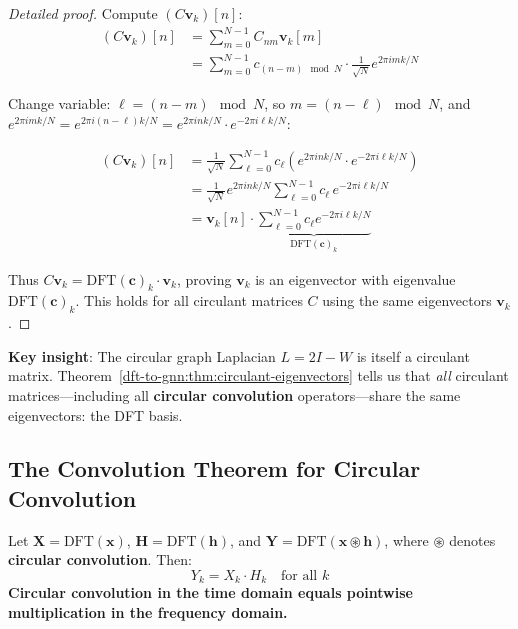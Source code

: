 \begin{notechapter}
\begin{proof}[Detailed proof]
Compute $(C\mathbf{v}_k)[n]$:
\begin{align*}
(C\mathbf{v}_k)[n] 
    &= \sum_{m=0}^{N-1} C_{nm} \mathbf{v}_k[m] \\
    &= \sum_{m=0}^{N-1} c_{(n-m) \mod N} \cdot \frac{1}{\sqrt{N}} 
       e^{2\pi i mk/N}
\end{align*}

Change variable: $\ell = (n-m) \mod N$, so $m = (n-\ell) \mod N$, and 
$e^{2\pi i mk/N} = e^{2\pi i (n-\ell)k/N} = e^{2\pi i nk/N} 
\cdot e^{-2\pi i \ell k/N}$:

\begin{align*}
(C\mathbf{v}_k)[n] 
    &= \frac{1}{\sqrt{N}} \sum_{\ell=0}^{N-1} c_\ell 
       \left( e^{2\pi i nk/N} \cdot e^{-2\pi i \ell k/N} \right) \\
    &= \frac{1}{\sqrt{N}} e^{2\pi i nk/N} 
       \sum_{\ell=0}^{N-1} c_\ell \, e^{-2\pi i \ell k/N} \\
    &= \mathbf{v}_k[n] \cdot \underbrace{\sum_{\ell=0}^{N-1} c_\ell 
       e^{-2\pi i \ell k/N}}_{\text{DFT}(\mathbf{c})_k}
\end{align*}

Thus $C\mathbf{v}_k = \text{DFT}(\mathbf{c})_k \cdot \mathbf{v}_k$, 
proving $\mathbf{v}_k$ is an eigenvector with eigenvalue 
$\text{DFT}(\mathbf{c})_k$. This holds for all circulant matrices $C$
using the same eigenvectors $\mathbf{v}_k$.
\end{proof}

\textbf{Key insight}: The circular graph Laplacian $L = 2I - W$ is 
itself a circulant matrix. Theorem~\ref{dft-to-gnn:thm:circulant-eigenvectors} 
tells us that \emph{all} circulant matrices---including all 
\textbf{circular convolution} operators---share the same eigenvectors: 
the DFT basis.

\subsection{The Convolution Theorem for Circular Convolution}

\begin{theorem}
\label{dft-to-gnn:thm:convolution-circular}
Let $\mathbf{X} = \text{DFT}(\mathbf{x})$, 
$\mathbf{H} = \text{DFT}(\mathbf{h})$, and 
$\mathbf{Y} = \text{DFT}(\mathbf{x} \circledast \mathbf{h})$, where 
$\circledast$ denotes \textbf{circular convolution}. Then:
\begin{equation}
Y_k = X_k \cdot H_k \quad \text{for all } k
\end{equation}
\textbf{Circular convolution in the time domain equals pointwise 
multiplication in the frequency domain.}
\end{theorem}


\end{notechapter}
